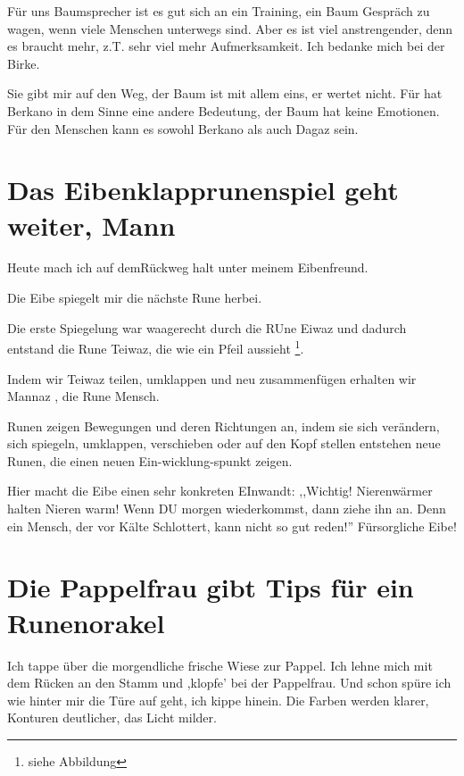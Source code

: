 \documentclass[11pt,titlepage,a5paper]{book}
\begin{document}
Für uns Baumsprecher ist es gut sich an ein Training, ein Baum Gespräch zu wagen, wenn viele Menschen unterwegs sind. Aber es ist viel anstrengender, denn es braucht mehr, z.T. sehr viel mehr Aufmerksamkeit. Ich bedanke mich bei der Birke. 

Sie gibt mir auf den Weg, der Baum ist mit allem eins, er wertet nicht. Für hat Berkano  in dem Sinne eine andere Bedeutung, der Baum hat keine Emotionen. Für den Menschen kann es sowohl Berkano als auch Dagaz  sein.


\section*{Das Eibenklapprunenspiel geht weiter, Mann  }

Heute mach ich auf demRückweg halt unter meinem Eibenfreund. 

Die Eibe spiegelt mir die nächste Rune herbei.

Die erste Spiegelung war waagerecht durch die RUne Eiwaz und dadurch entstand die Rune Teiwaz, die wie ein Pfeil aussieht \footnote{siehe Abbildung}.

Indem wir Teiwaz  teilen, umklappen und neu zusammenfügen erhalten wir Mannaz , die Rune Mensch. 

Runen zeigen Bewegungen  und deren Richtungen an, indem sie sich verändern, sich spiegeln, umklappen, verschieben oder auf den Kopf stellen entstehen neue Runen, die einen neuen Ein-wicklung-spunkt zeigen.

Hier macht die Eibe einen sehr konkreten EInwandt: ,,Wichtig! Nierenwärmer halten Nieren warm! Wenn DU morgen wiederkommst, dann ziehe ihn an. Denn ein Mensch, der vor Kälte Schlottert, kann nicht so gut reden!'' Fürsorgliche Eibe!


\section*{Die Pappelfrau gibt Tips für ein Runenorakel  }

Ich tappe über die morgendliche frische Wiese zur Pappel. Ich lehne mich mit dem Rücken an den Stamm und ,klopfe' bei der Pappelfrau. Und schon spüre ich wie hinter mir die Türe auf geht, ich kippe hinein. Die Farben werden klarer, Konturen deutlicher, das Licht milder.
\end{document}
